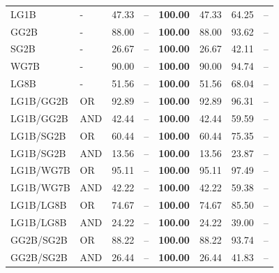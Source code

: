 \documentclass{article}
\begin{document}
{\begin{longtable}{llrrrrrr}
LG1B                     & -       & 47.33             & --            & \textbf{100.00} & 47.33             & 64.25             & --    \\
 GG2B                     & -       & 88.00             & --            & \textbf{100.00} & 88.00             & 93.62             & --    \\
 SG2B                     & -       & 26.67             & --            & \textbf{100.00} & 26.67             & 42.11             & --    \\
 WG7B                     & -       & 90.00             & --            & \textbf{100.00} & 90.00             & 94.74             & --    \\
 LG8B                     & -       & 51.56             & --            & \textbf{100.00} & 51.56             & 68.04             & --    \\
 LG1B/GG2B                & OR      & 92.89             & --            & \textbf{100.00} & 92.89             & 96.31             & --    \\
 LG1B/GG2B                & AND     & 42.44             & --            & \textbf{100.00} & 42.44             & 59.59             & --    \\
 LG1B/SG2B                & OR      & 60.44             & --            & \textbf{100.00} & 60.44             & 75.35             & --    \\
 LG1B/SG2B                & AND     & 13.56             & --            & \textbf{100.00} & 13.56             & 23.87             & --    \\
 LG1B/WG7B                & OR      & 95.11             & --            & \textbf{100.00} & 95.11             & 97.49             & --    \\
 LG1B/WG7B                & AND     & 42.22             & --            & \textbf{100.00} & 42.22             & 59.38             & --    \\
 LG1B/LG8B                & OR      & 74.67             & --            & \textbf{100.00} & 74.67             & 85.50             & --    \\
 LG1B/LG8B                & AND     & 24.22             & --            & \textbf{100.00} & 24.22             & 39.00             & --    \\
 GG2B/SG2B                & OR      & 88.22             & --            & \textbf{100.00} & 88.22             & 93.74             & --    \\
 GG2B/SG2B                & AND     & 26.44             & --            & \textbf{100.00} & 26.44             & 41.83             & --    \\

\end{longtable}}
\end{document}
